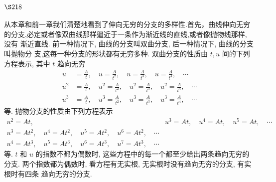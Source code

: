 \section{$\S 218$}

从本章和前一章我们清楚地看到了伸向无穷的分支的多样性.首先，曲线伸向无穷的分支,必定或者像双曲线那样逼近于一条作为渐近线的直线,或者像抛物线那样, 没有 渐近直线. 前一种情况下, 曲线的分支叫双曲分支, 后一种情况下, 曲线的分支叫抛物分 支,这每一种分支的形状都有无穷多种. 双曲分支的性质由 $t, u$ 间的下列方程表示, 其中 $t$ 趋向无穷
\[
\begin{aligned}
u & =\frac{A}{t}, \quad u=\frac{A}{t^{2}}, \quad u=\frac{A}{t^{3}}, \quad u=\frac{A}{t^{4}}, \quad \cdots \\
u^{2} & =\frac{A}{t}, \quad u^{2}=\frac{A}{t^{2}}, \quad u^{2}=\frac{A}{t^{3}}, \quad u^{2}=\frac{A}{t^{4}}, \quad \cdots \\
u^{3} & =\frac{A}{t}, \quad u^{3}=\frac{A}{t^{2}}, \quad u^{3}=\frac{A}{t^{3}}, \quad u^{3}=\frac{A}{t^{4}}, \quad \cdots
\end{aligned}
\]
等. 抛物分支的性质由下列方程表示
\[
\begin{array}{rrr}
u^{2}=A t, & u^{3}=A t, \quad u^{4}=A t, \quad u^{5}=A t, \quad \cdots \\
u^{3}=A t^{2}, \quad u^{4}=A t^{2}, \quad u^{5}=A t^{2}, \quad u^{6}=A t^{2}, \quad \cdots \\
u^{4}=A t^{3}, \quad u^{5}=A t^{3}, \quad u^{6}=A t^{3}, \quad u^{7}=A t^{3}, \quad \cdots
\end{array}
\]
等. $t$ 和 $u$ 的指数不都为偶数时, 这些方程中的每一个都至少给出两条趋向无穷的分支. 两个指数都为偶数时, 看方程有无实根, 无实根时没有趋向无穷的分支, 有实根时有四条 趋向无穷的分支.

